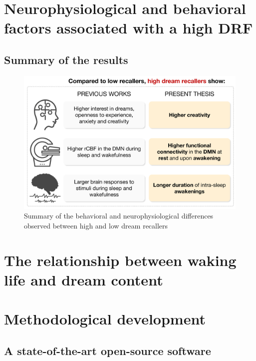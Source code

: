 \cleardoublepage
\chapter{Neurophysiological and behavioral factors associated with a high DRF}
\label{disc:drf}

\section{Summary of the results}
\label{disc:drf:summary}

\begin{figure}[htb]
	\includegraphics[width=\textwidth]{Fig/Discussion/HR_recap.png}
	\caption[Summary of the results on DRF]{Summary of the behavioral and neurophysiological differences observed between high and low dream recallers}
	\label{fig:disc:drf:summary}
\end{figure}


\cleardoublepage
\chapter{The relationship between waking life and dream content}
\label{disc:wle}

\cleardoublepage
\chapter{Methodological development}
\label{disc:methods}

\section{A state-of-the-art open-source software}
\label{disc:methods:software}



